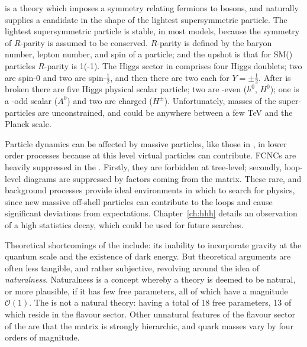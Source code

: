 \SUSY is a theory which imposes a symmetry relating fermions to bosons, and naturally supplies a
\dm candidate in the shape of the lightest supersymmetric
particle.
The lightest supersymmetric particle is stable, in most models, because the symmetry of $R$-parity
is assumed to be conserved.
$R$-parity is  defined by the baryon number, lepton number, and spin of a particle; and the
upshot is that for SM(\SUSY) particles $R$-parity is 1(-1).
The Higgs sector in \SUSY comprises four Higgs doublets; two are spin-0 and two are spin-$\tfrac12$,
and then there are two each for $Y=\pm\tfrac12$.
After \SUSY is broken there are five Higgs physical scalar particle; two are \CP-even ($h^0$,
$H^0$); one is a \CP-odd scalar ($A^0$) and two are charged ($H^\pm$).
Unfortunately, masses of the super-particles are unconstrained, and could be anywhere between a few
TeV and the Planck scale.


Particle dynamics can be affected by massive \np particles, like those in \SUSY, in lower order
processes because at this level virtual particles can contribute.
\glspl{FCNC} are heavily suppressed in the \sm.
Firstly, they are forbidden at tree-level; secondly, loop-level diagrams are suppressed by factors
coming from the \ckm matrix.
These rare, and  background processes provide ideal environments in which to search for \bsm
physics, since new massive off-shell particles can contribute to the loops and cause significant
deviations from \sm expectations.
Chapter~\ref{ch:hhh} details an observation of a high statistics \fcnc decay,
which could be used for future \np searches.



Theoretical shortcomings of the \sm include: its inability to incorporate gravity at the quantum
scale and the existence of dark energy.
But theoretical arguments are often less tangible, and
rather subjective, revolving around the idea of \emph{naturalness}.
Naturalness is a concept whereby a theory is deemed to be natural, or more plausible, if it has few
free parameters, all of which have a magnitude $\mathcal{O}(1)$.
The \sm is not a natural theory: having
a total of 18 free parameters, 13 of which reside in the flavour
sector.
Other unnatural features of the flavour sector of the \sm are that the \ckm matrix is strongly
hierarchic, and quark masses vary by four orders of magnitude.

